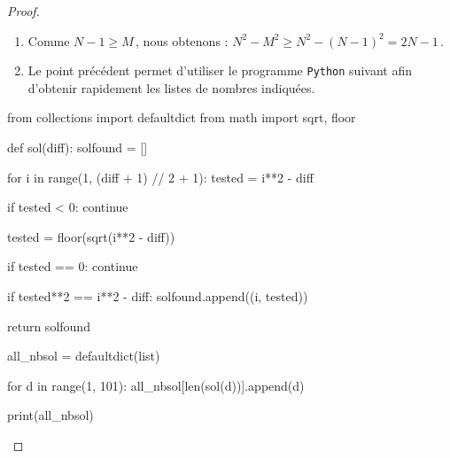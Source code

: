 \begin{proof}
	\leavevmode
	
	\vspace{-1ex}
	\begin{enumerate}
		\item Comme $N - 1 \geq M$\,, nous obtenons :
		$N^2 - M^2 \geq N^2 - (N - 1)^2 = 2N - 1$\,.

		\item Le point précédent permet d'utiliser le programme \verb#Python# suivant afin d'obtenir rapidement les listes de nombres indiquées.
	\end{enumerate}

\bgroup
\small
\begin{Python}
from collections import defaultdict
from math        import sqrt, floor

def sol(diff):
    solfound = []

    for i in range(1, (diff + 1) // 2 + 1):
        tested = i**2 - diff

        if tested < 0:
            continue

        tested = floor(sqrt(i**2 - diff))

        if tested == 0:
            continue

        if tested**2 == i**2 - diff:
            solfound.append((i, tested))

    return solfound

all_nbsol = defaultdict(list)

for d in range(1, 101):
    all_nbsol[len(sol(d))].append(d)

print(all_nbsol)
\end{Python}
\egroup	


		\qedhere
\end{proof}

	
%
%
%
%
%
%
%
